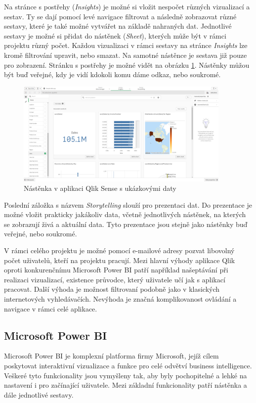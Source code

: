 \documentclass[czech,master,public,dept460,male,cpdeclaration,oneside]{diploma}
\begin{document}
Na stránce s postřehy (\textit{Insights})  je možné si vložit nespočet různých vizualizací a sestav. Ty se dají pomocí levé navigace filtrovat a následně zobrazovat různé sestavy, které je také možné vytvářet na základě nahraných dat. Jednotlivé sestavy je možné si přidat do nástěnek (\textit{Sheet}), kterých může být v rámci projektu různý počet. Každou vizualizaci v rámci sestavy na stránce \textit{Insights} lze kromě filtrování upravit, nebo smazat. Na samotné nástěnce je sestava již pouze pro zobrazení. Stránku s postřehy je možné vidět na obrázku \ref{fig:qlik_dashboard}. Nástěnky můžou být buď veřejné, kdy je vidí kdokoli komu dáme odkaz, nebo soukromé.

\begin{figure}[!ht]
    \centering
    \includegraphics[width=0.93\textwidth]{Diplomka/Figures/qlik_dashboard.png}
    \caption{Nástěnka v aplikaci Qlik Sense s ukázkovými daty}
    \label{fig:qlik_dashboard}
\end{figure}

Poslední záložka s názvem \textit{Storytelling} slouží pro prezentaci dat. Do prezentace je možné vložit prakticky jakákoliv data, včetně jednotlivých nástěnek, na kterých se zobrazují živá a aktuální data. Tyto prezentace jsou stejně jako nástěnky buď veřejné, nebo soukromé.

V rámci celého projektu je možné pomocí e-mailové adresy pozvat libovolný počet uživatelů, kteří na projektu pracují. Mezi hlavní výhody aplikace Qlik oproti konkurenčnímu Microsoft Power BI patří například našeptávání při realizaci vizualizací, existence průvodce, který uživatele učí jak s aplikací pracovat. Další výhoda je možnost filtrovaní podobně jako v klasických internetových vyhledávačích. Nevýhoda je značná komplikovanost ovládání a navigace v rámci celé aplikace.

\subsection{Microsoft Power BI}
\label{sec:microsoft_power_bi}
Microsoft Power BI je komplexní platforma firmy Microsoft, jejíž cílem poskytovat interaktivní vizualizace a funkce pro celé odvětví business intelligence. Veškeré tyto funkcionality jsou vymyšleny tak, aby byly pochopitelné a lehké na nastavení i pro začínající uživatele. Mezi základní funkcionality patří nástěnka a dále jednotlivé sestavy.
\end{document}

